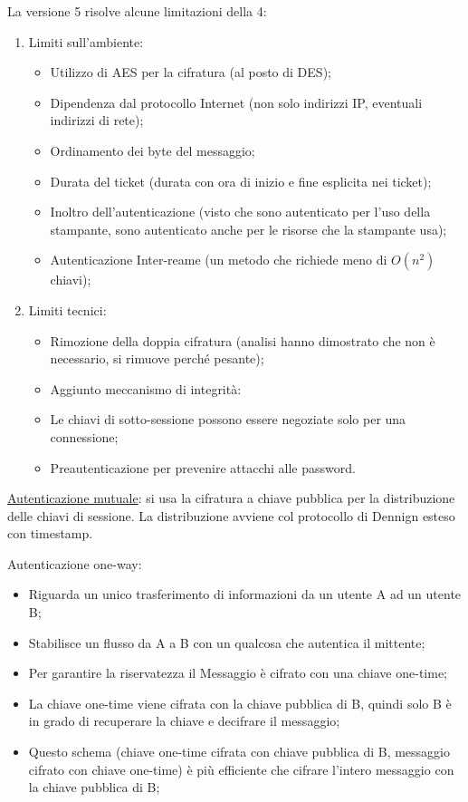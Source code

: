 La versione 5 risolve alcune limitazioni della 4:
\begin{enumerate}
    \item Limiti sull'ambiente:
	\begin{itemize}
	    \item Utilizzo di AES per la cifratura (al posto di DES);
		\item Dipendenza dal protocollo Internet (non solo indirizzi IP, eventuali indirizzi di rete);
		\item Ordinamento dei byte del messaggio;
		\item Durata del ticket (durata con ora di inizio e fine esplicita nei ticket);
		\item Inoltro dell'autenticazione (visto che sono autenticato per l'uso della stampante, sono autenticato anche per le risorse che la stampante usa);
		\item Autenticazione Inter-reame (un metodo che richiede meno di $O(n^2)$ chiavi);
	\end{itemize}
    \item Limiti tecnici:
    \begin{itemize}
        \item Rimozione della doppia cifratura (analisi hanno dimostrato che non è necessario, si rimuove perché pesante);
		\item Aggiunto meccanismo di integrità:
		\item Le chiavi di sotto-sessione possono essere negoziate solo per una connessione;
		\item Preautenticazione per prevenire attacchi alle password.
    \end{itemize}
\end{enumerate}

\underline{Autenticazione mutuale}: si usa la cifratura a chiave pubblica per la distribuzione delle chiavi di sessione. La distribuzione avviene col protocollo di Dennign esteso con timestamp.

Autenticazione one-way: 
\begin{itemize}
    \item Riguarda un unico trasferimento di informazioni da un utente A ad un utente B;
	\item Stabilisce un flusso da A a B con un qualcosa che autentica il mittente;
	\item Per garantire la riservatezza il Messaggio è cifrato con una chiave one-time;
	\item La chiave one-time viene cifrata con la chiave pubblica di B, quindi solo B è in grado di recuperare la chiave e decifrare il messaggio;
	\item Questo schema (chiave one-time cifrata con chiave pubblica di B, messaggio cifrato con chiave one-time) è più efficiente che cifrare l'intero messaggio con la chiave pubblica di B;
\end{itemize}

